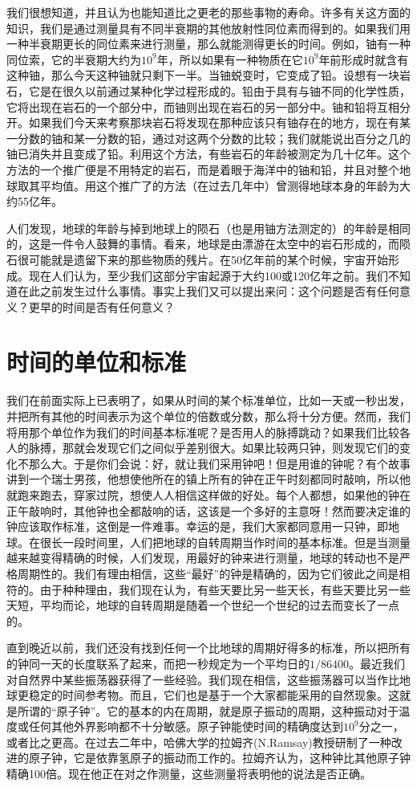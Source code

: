 \documentclass[12pt,oneside]{book}
\begin{document}
\begin{common-format}
我们很想知道，并且认为也能知道比之更老的那些事物的寿命。许多有关这方面的知识，我们是通过测量具有不同半衰期的其他放射性同位素而得到的。如果我们用一种半衰期更长的同位素来进行测量，那么就能测得更长的时间。例如，铀有一种同位索，它的半衰期大约为$ 10^9 $年，所以如果有一种物质在它$ 10^9 $年前形成时就含有这种铀，那么今天这种铀就只剩下一半。当铀蜕变时，它变成了铅。设想有一块岩石，它是在很久以前通过某种化学过程形成的。铅由于具有与铀不同的化学性质，它将出现在岩石的一个部分中，而铀则出现在岩石的另一部分中。铀和铅将互相分开。如果我们今天来考察那块岩石将发现在那种应该只有铀存在的地方，现在有某一分数的铀和某一分数的铅，通过对这两个分数的比较；我们就能说出百分之几的铀已消失并且变成了铅。利用这个方法，有些岩石的年龄被测定为几十亿年。这个方法的一个推广便是不用特定的岩石，而是着眼于海洋中的铀和铅，并且对整个地球取其平均值。用这个推广了的方法（在过去几年中）曾测得地球本身的年龄为大约55亿年。

人们发现，地球的年龄与掉到地球上的陨石（也是用铀方法测定的）的年龄是相同的，这是一件令人鼓舞的事情。看来，地球是由漂游在太空中的岩石形成的，而陨石很可能就是遗留下来的那些物质的残片。在50亿年前的某个时候，宇宙开始形成。现在人们认为，至少我们这部分宇宙起源于大约100或120亿年之前。我们不知道在此之前发生过什么事情。事实上我们又可以提出来问：这个问题是否有任何意义？更早的时间是否有任何意义？


\section{时间的单位和标准}
我们在前面实际上已表明了，如果从时间的某个标准单位，比如一天或一秒出发，并把所有其他的时间表示为这个单位的倍数或分数，那么将十分方便。然而，我们将用那个单位作为我们的时间基本标准呢？是否用人的脉搏跳动？如果我们比较各人的脉搏，那就会发现它们之间似乎差别很大。如果比较两只钟，则发现它们的变化不那么大。于是你们会说：好，就让我们采用钟吧！但是用谁的钟呢？有个故事讲到一个瑞士男孩，他想使他所在的镇上所有的钟在正午时刻都同时敲响，所以他就跑来跑去，穿家过院，想使人人相信这样做的好处。每个人都想，如果他的钟在正午敲响时，其他钟也全都敲响的话，这该是一个多好的主意呀！然而要决定谁的钟应该取作标准，这倒是一件难事。幸运的是，我们大家都同意用一只钟，即地球。在很长一段时间里，人们把地球的自转周期当作时间的基本标准。但是当测量越来越变得精确的时候，人们发现，用最好的钟来进行测量，地球的转动也不是严格周期性的。我们有理由相信，这些“最好”的钟是精确的，因为它们彼此之间是相符的。由于种种理由，我们现在认为，有些天要比另一些天长，有些天要比另一些天短，平均而论，地球的自转周期是随着一个世纪一个世纪的过去而变长了一点的。

直到晚近以前，我们还没有找到任何一个比地球的周期好得多的标准，所以把所有的钟同一天的长度联系了起来，而把一秒规定为一个平均日的$  1/86400$。最近我们对自然界中某些振荡器获得了一些经验。我们现在相信，这些振荡器可以当作比地球更稳定的时间参考物。而且，它们也是基于一个大家都能采用的自然现象。这就是所谓的“原子钟”。它的基本的内在周期，就是原子振动的周期，这种振动对于温度或任何其他外界影响都不十分敏感。原子钟能使时间的精确度达到$ 10^9 $分之一，或者比之更高。在过去二年中，哈佛大学的拉姆齐(N.Ramsay)教授研制了一种改进的原子钟，它是依靠氢原子的振动而工作的。拉姆齐认为，这种钟比其他原子钟精确100倍。现在他正在对之作测量，这些测量将表明他的说法是否正确。


\end{common-format}
\end{document}
